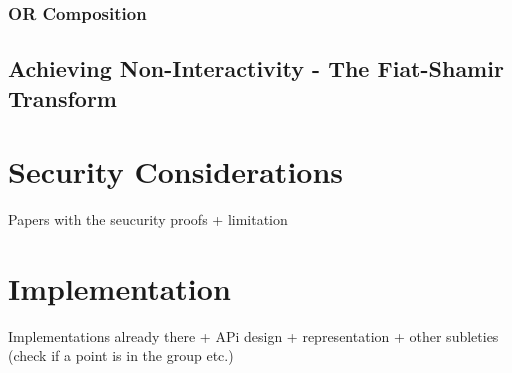 \documentclass[runningheads]{llncs}
\begin{document}
\subsubsection{OR Composition}

\subsection{Achieving Non-Interactivity - The Fiat-Shamir Transform}


\section{Security Considerations}

Papers with the seucurity proofs + limitation
\section{Implementation}
Implementations already there + APi design + representation + other subleties (check if a point is in the group etc.)




%
\end{document}
